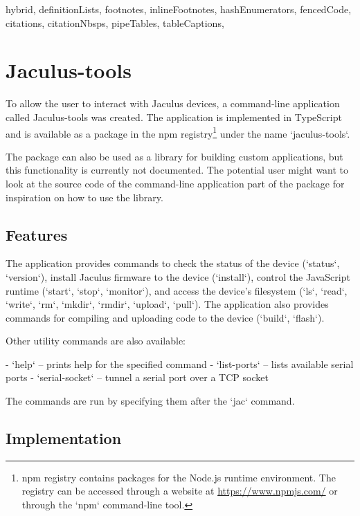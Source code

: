 \begin{markdown*}{%
  hybrid,
  definitionLists,
  footnotes,
  inlineFootnotes,
  hashEnumerators,
  fencedCode,
  citations,
  citationNbsps,
  pipeTables,
  tableCaptions,
}

\chapter{Jaculus-tools}

To allow the user to interact with Jaculus devices, a command-line application called Jaculus-tools was created. The application is implemented in TypeScript and is available as a package in the npm registry\footnote{npm registry contains packages for the Node.js runtime environment. The registry can be accessed through a website at \url{https://www.npmjs.com/} or through the `npm` command-line tool.} under the name `jaculus-tools`.

The package can also be used as a library for building custom applications, but this functionality is currently not documented. The potential user might want to look at the source code of the command-line application part of the package for inspiration on how to use the library.

\section{Features} \label{sec:tools-features}

The application provides commands to check the status of the device (`status`, `version`), install Jaculus firmware to the device (`install`), control the JavaScript runtime (`start`, `stop`, `monitor`), and access the device's filesystem (`ls`, `read`, `write`, `rm`, `mkdir`, `rmdir`, `upload`, `pull`). The application also provides commands for compiling and uploading code to the device (`build`, `flash`).

Other utility commands are also available:

  - `help` -- prints help for the specified command
  - `list-ports` -- lists available serial ports
  - `serial-socket` -- tunnel a serial port over a TCP socket

The commands are run by specifying them after the `jac` command.


\section{Implementation}


\end{markdown*}
